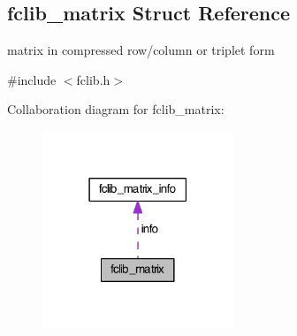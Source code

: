 \hypertarget{structfclib__matrix}{\subsection{fclib\-\_\-matrix Struct Reference}
\label{structfclib__matrix}
}


matrix in compressed row/column or triplet form  




{\ttfamily \#include $<$fclib.\-h$>$}



Collaboration diagram for fclib\-\_\-matrix\-:\nopagebreak
\begin{figure}[H]
\begin{center}
\leavevmode
\includegraphics[width=162pt]{structfclib__matrix__coll__graph}
\end{center}
\end{figure}

